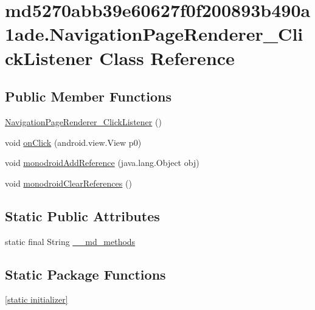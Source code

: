 \hypertarget{classmd5270abb39e60627f0f200893b490a1ade_1_1_navigation_page_renderer___click_listener}{
\section{md5270abb39e60627f0f200893b490a1ade.NavigationPageRenderer\_\-ClickListener Class Reference}
\label{classmd5270abb39e60627f0f200893b490a1ade_1_1_navigation_page_renderer___click_listener}
}
\subsection*{Public Member Functions}
\begin{CompactItemize}
\item 
\hyperlink{classmd5270abb39e60627f0f200893b490a1ade_1_1_navigation_page_renderer___click_listener_1b32e78e871f3091302ec3e46bf69476}{NavigationPageRenderer\_\-ClickListener} ()
\item 
void \hyperlink{classmd5270abb39e60627f0f200893b490a1ade_1_1_navigation_page_renderer___click_listener_975d110457a3664db2a90bdea3629a66}{onClick} (android.view.View p0)
\item 
void \hyperlink{classmd5270abb39e60627f0f200893b490a1ade_1_1_navigation_page_renderer___click_listener_428aab41c9b41260494dc6a3cdea0121}{monodroidAddReference} (java.lang.Object obj)
\item 
void \hyperlink{classmd5270abb39e60627f0f200893b490a1ade_1_1_navigation_page_renderer___click_listener_f660803b06bd1e254786d56ff75093bd}{monodroidClearReferences} ()
\end{CompactItemize}
\subsection*{Static Public Attributes}
\begin{CompactItemize}
\item 
static final String \hyperlink{classmd5270abb39e60627f0f200893b490a1ade_1_1_navigation_page_renderer___click_listener_3e5649188cf3a8722bdde6c7da3dc717}{\_\-\_\-md\_\-methods}
\end{CompactItemize}
\subsection*{Static Package Functions}
\begin{CompactItemize}
\item 
\hyperlink{classmd5270abb39e60627f0f200893b490a1ade_1_1_navigation_page_renderer___click_listener_14a9cbcc7eb41f32ad8eee615dab6ce0}{\mbox{[}static initializer\mbox{]}}
\end{CompactItemize}
